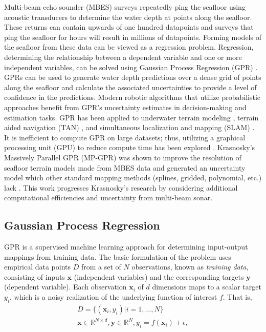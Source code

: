 Multi-beam echo sounder (MBES) surveys repeatedly ping the seafloor using acoustic transducers to determine the water depth at points along the seafloor. These returns can contain upwards of one hundred datapoints and surveys that ping the seafloor for hours will result in millions of datapoints. Forming models of the seafloor from these data can be viewed as a regression problem. Regression, determining the relationship between a dependent variable and one or more independent variables, can be solved using Gaussian Process Regression (GPR) \cite{Rasmussen2006}. GPRs can be used to generate water depth predictions over a dense grid of points along the seafloor and calculate the associated uncertainties to provide a level of confidence in the predictions. Modern robotic algorithms that utilize probabilistic approaches benefit from GPR's uncertainty estimates in decision-making and estimation tasks. GPR has been applied to underwater terrain modeling \cite{barkby2012bathymetric-2}, terrain aided navigation (TAN) \cite{Hitchcox2020APC}, and simultaneous localization and mapping (SLAM) \cite{MA2018336, Krasnosky2022}. It is inefficient to compute GPR on large datasets; thus, utilizing a graphical processing unit (GPU) to reduce compute time has been explored \cite{FraneyGPU, Gramacy2013MP}. Krasnosky's Massively Parallel GPR (MP-GPR) was shown to improve the resolution of seafloor terrain models made from MBES data and generated an uncertainty model which other standard mapping methods (splines, gridded, polynomial, etc.) lack \cite{Krasnosky2022}. This work progresses Krasnosky's research by considering additional computational efficiencies and uncertainty from multi-beam sonar.



\subsection{Gaussian Process Regression}

 GPR is a supervised machine learning approach for determining input-output mappings from training data. The basic formulation of the problem uses empirical data points $D$ from a set of $N$ observations, known as \textit{training data}, consisting of inputs $\boldsymbol{x}$ (independent variables) and the corresponding targets $\boldsymbol{y}$ (dependent variable). Each observation $\boldsymbol{x}_i$ of $d$ dimensions maps to a scalar target $y_i$, which is a noisy realization of the underlying function of interest $f$.  
That is,
\begin{gather*}
    D = \{(\boldsymbol{x}_i,y_i)|i=1,\ldots,N\} \\
    \boldsymbol{x}\in\mathbb{R}^{N \times d}, \boldsymbol{y} \in\mathbb{R}^{N}, y_i = f(\boldsymbol{x}_i) + \epsilon,
\end{gather*}


